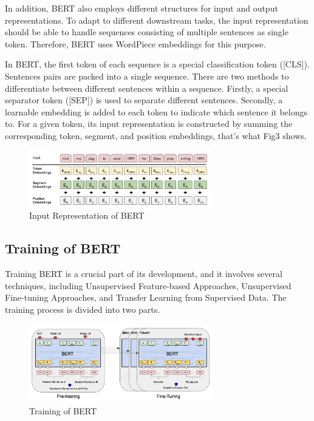 \documentclass[conference]{IEEEtran}
\begin{document}
\par In addition, BERT also employs different structures for input and output 
representations. To adapt to different downstream tasks, the input representation 
should be able to handle sequences consisting of multiple sentences as single token. 
Therefore, BERT uses WordPiece embeddings for this purpose.

\par In BERT, the first token of each sequence is a special classification token ([CLS]). 
Sentences pairs are packed into a single sequence. There are two methods to differentiate 
between different sentences within a sequence. Firstly, a special separator token ([SEP]) 
is used to separate different sentences. Secondly, a learnable embedding is added to each 
token to indicate which sentence it belongs to. For a given token, its input representation 
is constructed by summing the corresponding token, segment, and position embeddings, that's 
what Fig3 shows.

\begin{figure}[htbp]
    \centerline{\includegraphics[width = 8cm]{pic/fig3.png}}
    \caption{Input Representation of BERT}
    \label{fig}
\end{figure}


\subsection{Training of BERT}

\par Training BERT is a crucial part of its development, and it involves several 
techniques, including Unsupervised Feature-based Approaches, Unsupervised 
Fine-tuning Approaches, and Transfer Learning from Supervised Data. The training 
process is divided into two parts. 

\begin{figure}[htbp]
    \centerline{\includegraphics[width = 8cm]{pic/fig4.png}}
    \caption{Training of BERT}
    \label{fig}
\end{figure}
\end{document}
